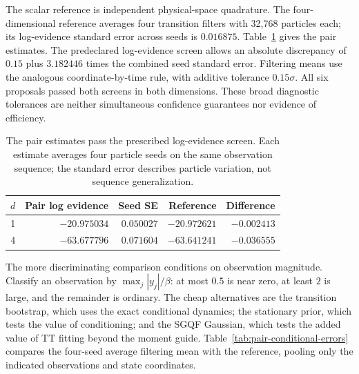 \documentclass[11pt]{article}
\begin{document}
The scalar reference is independent physical-space quadrature. The
four-dimensional reference averages four transition filters with 32,768
particles each; its log-evidence standard error across seeds is $0.016875$.
Table~\ref{tab:pair-reference} gives the pair estimates. The predeclared
log-evidence screen allows an absolute discrepancy of $0.15$ plus
$3.182446$ times the combined seed standard error. Filtering means use the
analogous coordinate-by-time rule, with additive tolerance $0.15\sigma$.
All six proposals passed both screens in both dimensions. These broad
diagnostic tolerances are neither simultaneous confidence guarantees nor
evidence of efficiency.

\begin{table}[htbp]
\centering
\begin{tabular}{crrrr}
\toprule
$d$ & Pair log evidence & Seed SE & Reference & Difference\\
\midrule
1 & $-20.975034$ & $0.050027$ & $-20.972621$ & $-0.002413$\\
4 & $-63.677796$ & $0.071604$ & $-63.641241$ & $-0.036555$\\
\bottomrule
\end{tabular}
\caption{The pair estimates pass the prescribed log-evidence screen.
Each estimate averages four particle seeds on the same observation sequence;
the standard error describes particle variation, not sequence generalization.}
\label{tab:pair-reference}
\end{table}

The more discriminating comparison conditions on observation magnitude.
Classify an observation by $\max_j|y_j|/\beta$: at most $0.5$ is near zero,
at least $2$ is large, and the remainder is ordinary. The cheap alternatives
are the transition bootstrap, which uses the exact conditional dynamics;
the stationary prior, which tests the value of conditioning; and the SGQF
Gaussian, which tests the added value of TT fitting beyond the moment guide.
Table~\ref{tab:pair-conditional-errors} compares the four-seed average
filtering mean with the reference, pooling only the indicated observations
and state coordinates.
\end{document}
